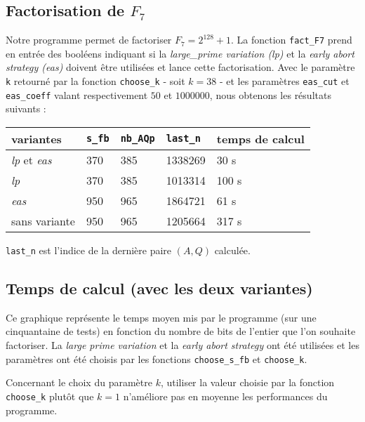 \subsection{Factorisation de $F_7$}

Notre programme permet de factoriser $F_7 = 2^{128} + 1$. La fonction 
\texttt{fact\_F7} prend en entrée des booléens indiquant si la
\textit{large\_prime variation (lp)} et la \textit{early abort strategy (eas)}
doivent être utilisées et lance cette factorisation. Avec le paramètre \texttt{k}
retourné par la fonction \texttt{choose\_k} - soit $k=38$ - et les paramètres 
\texttt{eas\_cut} et \texttt{eas\_coeff} valant respectivement $50$ et $1000000$,
nous obtenons les résultats suivants :  

\begin{center}
     \begin{tabular}{| l | l| l | l | l |}
     \hline
     variantes                    & \texttt{s\_fb} & \texttt{nb\_AQp} & \texttt{last\_n} & temps de calcul  \\ \hline
     \textit{lp} et \textit{eas}  &     370        &  385             &    1338269       &   30 s           \\ \hline
     \textit{lp}                  &     370        &  385             &    1013314       &   100 s          \\ \hline
     \textit{eas}                 &     950        &  965             &    1864721       &   61 s           \\ \hline
     sans variante                &     950        &  965             &    1205664       &   317 s          \\ \hline
    \end{tabular}
\end{center}

\hspace*{1.6 cm} \footnotesize{\texttt{last\_n} est l'indice de la dernière paire $(A,Q)$
calculée.}

\subsection{Temps de calcul (avec les deux variantes) }

Ce graphique représente le temps moyen mis par le programme (sur une cinquantaine de tests)
en fonction du nombre de bits de l'entier que l'on souhaite factoriser. La
\textit{large prime variation} et la \textit{early abort strategy} ont été 
utilisées et les paramètres ont été choisis par les fonctions 
\texttt{choose\_s\_fb} et \texttt{choose\_k}.\\

\begin{figure}[h]
\begin{center}
\end{center}
\end{figure}

Concernant le choix du paramètre $k$, utiliser la valeur choisie par la fonction 
\texttt{choose\_k} plutôt que $k=1$ n'améliore pas en moyenne les performances du 
programme. 
